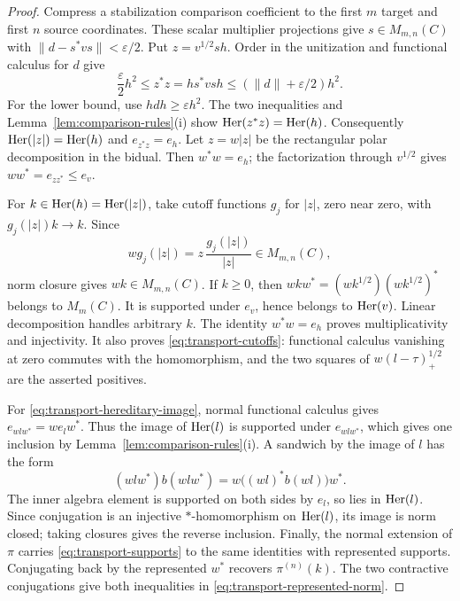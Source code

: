 \begin{proof}
Compress a stabilization comparison coefficient to the first \(m\)
target and first \(n\) source coordinates.  These scalar multiplier
projections give \(s\in M_{m,n}(C)\) with
\(\|d-s^*vs\|<\varepsilon/2\).  Put \(z=v^{1/2}s h\).
Order in the unitization and functional calculus for \(d\) give
\begin{equation}\label{eq:transport-order}
 \frac{\varepsilon}{2}h^2
 \le z^*z=h s^*vs h
 \le(\|d\|+\varepsilon/2)h^2.
\end{equation}
For the lower bound, use \(h d h\ge\varepsilon h^2\).
The two inequalities and Lemma~\ref{lem:comparison-rules}(i) show
\(\operatorname{Her}(z^*z)=\operatorname{Her}(h)\).  Consequently
\(\operatorname{Her}(|z|)=\operatorname{Her}(h)\) and \(e_{z^*z}=e_h\).
Let \(z=w|z|\) be the rectangular polar decomposition in the
bidual.  Then \(w^*w=e_h\); the factorization through \(v^{1/2}\)
gives \(ww^*=e_{zz^*}\le e_v\).

For \(k\in\operatorname{Her}(h)=\operatorname{Her}(|z|)\), take cutoff functions \(g_j\) for
\(|z|\), zero near zero, with \(g_j(|z|)k\to k\).  Since
\[
 w g_j(|z|)=z\,\frac{g_j(|z|)}{|z|}\in M_{m,n}(C),
\]
norm closure gives \(wk\in M_{m,n}(C)\).  If \(k\ge0\), then
\(wkw^*=(wk^{1/2})(wk^{1/2})^*\) belongs to \(M_m(C)\).
It is supported under \(e_v\), hence belongs to \(\operatorname{Her}(v)\).
Linear decomposition handles arbitrary \(k\).
The identity \(w^*w=e_h\) proves multiplicativity and injectivity.
It also proves \eqref{eq:transport-cutoffs}: functional calculus
vanishing at zero commutes with the homomorphism, and the two
squares of \(w(l-\tau)_+^{1/2}\) are the asserted positives.

For \eqref{eq:transport-hereditary-image}, normal functional
calculus gives \(e_{wlw^*}=we_lw^*\).  Thus the image of
\(\operatorname{Her}(l)\) is supported under \(e_{wlw^*}\), which gives one
inclusion by Lemma~\ref{lem:comparison-rules}(i).  A sandwich
by the image of \(l\) has the form
\[
 (wlw^*)b(wlw^*)
 =w\bigl((wl)^*b(wl)\bigr)w^*.
\]
The inner algebra element is supported on both sides by \(e_l\),
so lies in \(\operatorname{Her}(l)\).  Since conjugation is an injective
\(*\)-homomorphism on \(\operatorname{Her}(l)\), its image is norm closed;
taking closures gives the reverse inclusion.  Finally, the normal
extension of \(\pi\) carries
\eqref{eq:transport-supports} to the same identities with
represented supports.  Conjugating back by the represented \(w^*\)
recovers \(\pi^{(n)}(k)\).  The two contractive conjugations give
both inequalities in \eqref{eq:transport-represented-norm}.
\end{proof}

